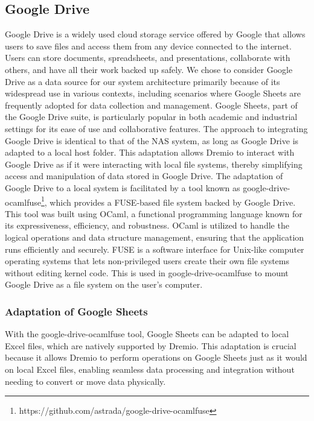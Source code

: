 \subsection{Google Drive}
Google Drive is a widely used cloud storage service offered by Google that allows users to save files and access them from any device connected to the internet. Users can store documents, spreadsheets, and presentations, collaborate with others, and have all their work backed up safely.
We chose to consider Google Drive as a data source for our system architecture primarily because of its widespread use in various contexts, including scenarios where Google Sheets are frequently adopted for data collection and management. Google Sheets, part of the Google Drive suite, is particularly popular in both academic and industrial settings for its ease of use and collaborative features.
The approach to integrating Google Drive is identical to that of the \ac{NAS} system, as long as Google Drive is adapted to a local host folder. This adaptation allows Dremio to interact with Google Drive as if it were interacting with local file systems, thereby simplifying access and manipulation of data stored in Google Drive.
The adaptation of Google Drive to a local system is facilitated by a tool known as google-drive-ocamlfuse\footnote{https://github.com/astrada/google-drive-ocamlfuse}, which provides a \ac{FUSE}-based file system backed by Google Drive. This tool was built using OCaml, a functional programming language known for its expressiveness, efficiency, and robustness. OCaml is utilized to handle the logical operations and data structure management, ensuring that the application runs efficiently and securely. \ac{FUSE} is a software interface for Unix-like computer operating systems that lets non-privileged users create their own file systems without editing kernel code. This is used in google-drive-ocamlfuse to mount Google Drive as a file system on the user's computer.
\subsubsection{Adaptation of Google Sheets}
With the google-drive-ocamlfuse tool, Google Sheets can be adapted to local Excel files, which are natively supported by Dremio. This adaptation is crucial because it allows Dremio to perform operations on Google Sheets just as it would on local Excel files, enabling seamless data processing and integration without needing to convert or move data physically.
